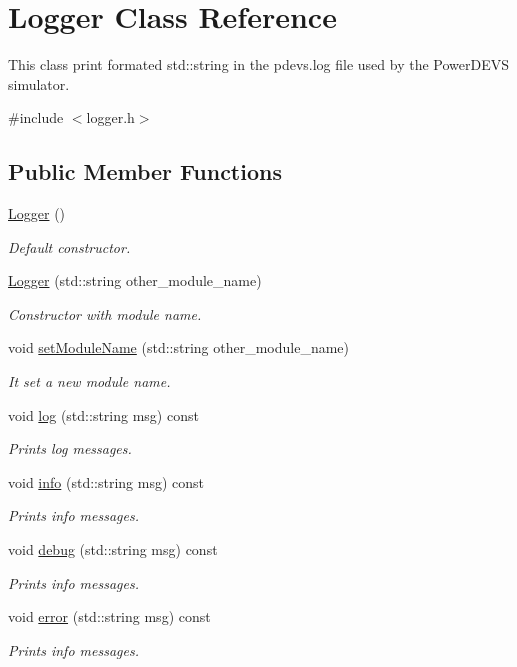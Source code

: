 \hypertarget{classLogger}{}\section{Logger Class Reference}
\label{classLogger}


This class print formated std\+::string in the pdevs.\+log file used by the Power\+D\+E\+VS simulator.  




{\ttfamily \#include $<$logger.\+h$>$}

\subsection*{Public Member Functions}
\begin{DoxyCompactItemize}
\item 
\hyperlink{classLogger_abc41bfb031d896170c7675fa96a6b30c}{Logger} ()
\begin{DoxyCompactList}\small\item\em Default constructor. \end{DoxyCompactList}\item 
\hyperlink{classLogger_af302c98a9648b87bd0f4e2369f36b373}{Logger} (std\+::string other\+\_\+module\+\_\+name)
\begin{DoxyCompactList}\small\item\em Constructor with module name. \end{DoxyCompactList}\item 
void \hyperlink{classLogger_a99b49a8748bc611e40c21017b8cf7c4c}{set\+Module\+Name} (std\+::string other\+\_\+module\+\_\+name)
\begin{DoxyCompactList}\small\item\em It set a new module name. \end{DoxyCompactList}\item 
void \hyperlink{classLogger_a2cd14398535681e7bf23212e52172bb6}{log} (std\+::string msg) const 
\begin{DoxyCompactList}\small\item\em Prints log messages. \end{DoxyCompactList}\item 
void \hyperlink{classLogger_a1e7cec2e73916bef9d29da5ca9885db4}{info} (std\+::string msg) const 
\begin{DoxyCompactList}\small\item\em Prints info messages. \end{DoxyCompactList}\item 
void \hyperlink{classLogger_a4809dd30829396100b8ba0549c30516c}{debug} (std\+::string msg) const 
\begin{DoxyCompactList}\small\item\em Prints info messages. \end{DoxyCompactList}\item 
void \hyperlink{classLogger_aad5f47bafa7057b35d81f8191900bde2}{error} (std\+::string msg) const 
\begin{DoxyCompactList}\small\item\em Prints info messages. \end{DoxyCompactList}\end{DoxyCompactItemize}


